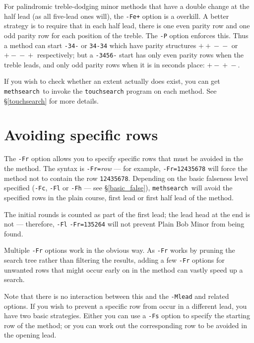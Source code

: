 \documentclass[a4paper,11pt,oneside]{book}
\makeatletter
\newcommand{\oidx}[2]{\index{#1@{\hspace*{-\optwidth}\texttt{-}#2}|ulink}}
\newcommand{\oi}[1]{\index{#1@{\hspace*{-\optwidth}\texttt{-}\texttt{#1}}}}
\def\methsearch{\texttt{meth\-search}}
\newcommand{\sref}[1]{\hyperref[#1]{\S\ref{#1}}}
\makeatother
\begin{document}
For palindromic treble-dodging minor methods that have a double change at 
the half lead (as all five-lead ones will), the \verb^-Fe+^ option is a
overkill.  A better strategy is to require that in each half lead, there 
is one even parity row and one odd parity row for each position
of the treble.  The \verb+-P+\oi{P} option enforces this.
Thus a method can start \verb+-34-+ or \verb+34-34+ which have 
parity structures $+{}+{}-{}-$ or $+{}-{}-{}+$ respectively; 
but a \verb+-3456-+ start has only even parity rows when the treble leads, 
and only odd parity rows when it is in seconds place: $+{}-{}+{}-$.

If you wish to check whether an extent actually does exist, you can 
get \methsearch\ to invoke the \texttt{touchsearch} program on each 
method.  See \sref{touchsearch} for more details.


\section{Avoiding specific rows}\label{avoidrow}

The \verb+-Fr+\oidx{Fr}{\texttt{Fr}} option allows you to specify
specific rows that must be avoided in the the method.%
The syntax is \verb+-Fr=+\textit{row} --- for example, \verb+-Fr=12435678+
will force the method not to contain the row \verb+12435678+.
Depending on the basic falseness level specified (\verb+-Fc+, 
\verb+-Fl+ or \verb+-Fh+\oi{Fc}\oi{Fl}\oi{Fh} --- see \sref{basic_false}), 
\methsearch\ will avoid the specified rows in the plain course, 
first lead or first half lead of the method.

The initial rounds is counted as part of the first lead;
the lead head at the end is not --- therefore, \verb+-Fl+ 
\verb+-Fr=135264+ will not prevent Plain Bob Minor from being found.

Multiple \verb+-Fr+ options work in the obvious way.  As \verb+-Fr+ works by 
pruning the search tree rather than filtering the results, adding a few 
\verb+-Fr+ options for unwanted rows that might occur early on in the 
method can vastly speed up a search.

Note that there is no interaction between this and the \verb+-Mlead+ and 
related options.  If you wish to prevent a specific row from occur in a 
different lead, you have two basic strategies.   Either you can use a 
\verb+-Fs+ option to specify the starting row of the method;
or you can work out the corresponding row to be avoided in the opening lead.  
\end{document}

